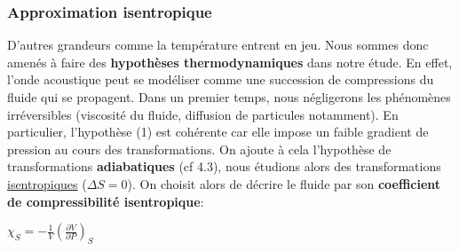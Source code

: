 \documentclass[a4paper, 12pt]{article}
\begin{document}
\subsubsection{Approximation isentropique}
D'autres grandeurs comme la température entrent en jeu. Nous sommes donc amenés à faire des \textbf{hypothèses thermodynamiques} dans notre étude. En effet, l'onde acoustique peut se modéliser comme une succession de compressions du fluide qui se propagent. Dans un premier temps, nous négligerons les phénomènes irréversibles (viscosité du fluide, diffusion de particules notamment). En particulier, l'hypothèse (1) est cohérente car elle impose un faible gradient de pression au cours des transformations.\newline
On ajoute à cela l'hypothèse de transformations \textbf{adiabatiques} (cf 4.3), nous étudions alors des transformations \underline{isentropiques} ($\Delta S=0$). \newline \newline
On choisit alors de décrire le fluide par son \textbf{coefficient de compressibilité isentropique}:
\begin{center}
$\chi_S=-\frac{1}{V}{(\frac{\partial V}{\partial P})}_S$
\end{center}
\end{document}
